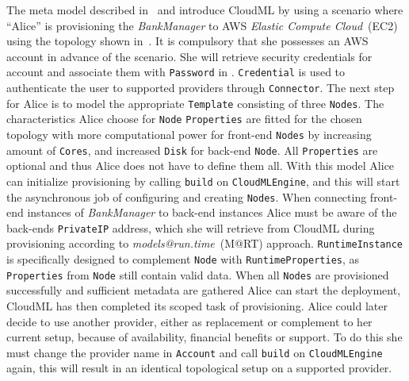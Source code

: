 



The meta model described in~ and introduce CloudML by
using a scenario where ``Alice'' is provisioning the \emph{BankManager} to AWS \emph{Elastic Compute Cloud}~(EC2)
using the topology shown in~.
It is compulsory that she possesses an AWS account in advance of the scenario.
She will retrieve security credentials for account 
and associate them with \texttt{Password} in .
\texttt{Credential} is used to authenticate the user to supported providers through \texttt{Connector}.
The next step for Alice is to model the appropriate \texttt{Template} consisting
of three \texttt{Nodes}.
The characteristics Alice choose for \texttt{Node} \texttt{Properties} are fitted
for the chosen topology with more computational power for front-end \texttt{Nodes}
by increasing amount of \texttt{Cores}, and increased \texttt{Disk} for back-end \texttt{Node}.
All \texttt{Properties} are optional and thus Alice does not have to define them all.
With this model Alice can initialize provisioning by calling \texttt{build} on \texttt{CloudMLEngine},
and this will start the asynchronous job of configuring and creating \texttt{Nodes}.
When connecting front-end instances of \emph{BankManager} to back-end instances Alice must 
be aware of the back-ends \texttt{PrivateIP} address, which she will retrieve from CloudML
during provisioning according to \emph{models@run.time}~(M@RT) approach.
\texttt{RuntimeInstance} is specifically designed to complement \texttt{Node} with \texttt{RuntimeProperties},
as \texttt{Properties} from \texttt{Node} still contain valid data.
When all \texttt{Nodes} are provisioned successfully and sufficient metadata are gathered
Alice can start the deployment, CloudML has then completed its scoped task of provisioning.
Alice could later decide to use another provider, either as replacement or complement to her current setup,
because of availability, financial benefits  or support.
To do this she must change the provider name in \texttt{Account} and call \texttt{build} on \texttt{CloudMLEngine} again,
this will result in an identical topological setup on a supported provider.

